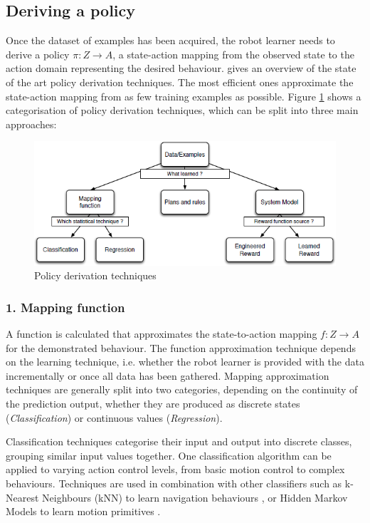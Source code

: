 \subsection{Deriving a policy}\label{subsec:Deriving a policy}
Once the dataset of examples has been acquired, the robot learner needs to derive a policy $\pi : Z \rightarrow A$, a state-action mapping from the observed state to the action domain representing the desired behaviour. 
\cite{chernova2014robot} gives an overview of the state of the art policy derivation techniques.
The most efficient ones approximate the state-action mapping from as few training examples as possible.
Figure \ref{fig:Learning-techniques} \cite{argall2009survey} shows a categorisation of policy derivation techniques, which can be split into three main approaches:
  \begin{figure}[!h]
    \centering
    \includegraphics[scale=0.75]{figures/Learning-techniques}
    \caption{Policy derivation techniques}
    \label{fig:Learning-techniques}
  \end{figure}

\subsubsection{1. Mapping function} 
A function is calculated that approximates the state-to-action mapping $f : Z \rightarrow A$ for the demonstrated behaviour. The function approximation technique depends on the learning technique, i.e. whether the robot learner is provided with the data incrementally or once all data has been gathered. Mapping approximation techniques are generally split into two categories, depending on the continuity of the prediction output, whether they are produced as discrete states (\textit{Classification}) or continuous values (\textit{Regression}).\cite{argall2009survey}

Classification techniques categorise their input and output into discrete classes, grouping similar input values together. One classification algorithm can be applied to varying action control levels, from basic motion control to complex behaviours. Techniques are used in combination with other classifiers such as k-Nearest Neighbours (kNN) to learn navigation behaviours \cite{saunders2006teaching}, or Hidden Markov Models \cite{hovland1996skill} to learn motion primitives \cite{rybski1999interactive}.

